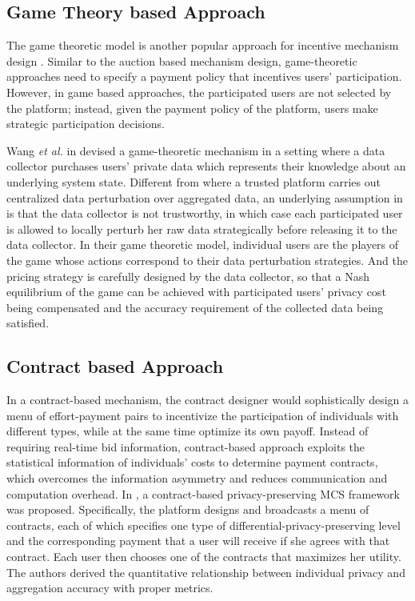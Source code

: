 \subsection{Game Theory based Approach}
The game theoretic model is another popular approach for incentive mechanism design \cite{DejunJ, he2017exchange,Yang17}. 
Similar to the auction based mechanism design, game-theoretic approaches need to specify a payment policy that incentives users' participation. However, in game based approaches, the participated users are not selected by the platform; instead, given the payment policy of the platform, users make strategic participation decisions. 

Wang \textsl{et al.} in \cite{wang2016value} devised a game-theoretic mechanism in a setting where a data collector purchases users' private data which represents their knowledge about an underlying system state. Different from \cite{ghosh2015selling,jin2016,zhang2016privacy} where a trusted platform carries out centralized data perturbation over aggregated data, an underlying assumption in \cite{wang2016value} is that the data collector is not trustworthy, in which case each participated user is allowed to locally perturb her raw data strategically before releasing it to the data collector. In their game theoretic model, individual users are the players of the game whose actions correspond to their data perturbation strategies. And the pricing strategy is carefully designed by the data collector, so that a Nash equilibrium of the game can be achieved with participated users' privacy cost being compensated and the accuracy requirement of the collected data being satisfied.

\subsection{Contract based Approach}
In a contract-based mechanism, the contract designer would sophistically design a menu of effort-payment pairs to incentivize the participation of individuals with different types, while at the same time optimize its own payoff. Instead of requiring real-time bid information, contract-based approach exploits the statistical information of individuals' costs to determine payment contracts, which overcomes the information asymmetry and reduces communication and computation overhead. In \cite{Kun1}, a contract-based privacy-preserving MCS framework was proposed. Specifically, the platform designs and broadcasts a menu of contracts, each of which specifies one type of differential-privacy-preserving level and the corresponding payment that a user will receive if she agrees with that contract. Each user then chooses one of the contracts that maximizes her utility. The authors derived the quantitative relationship between individual privacy and aggregation accuracy with proper metrics. 

